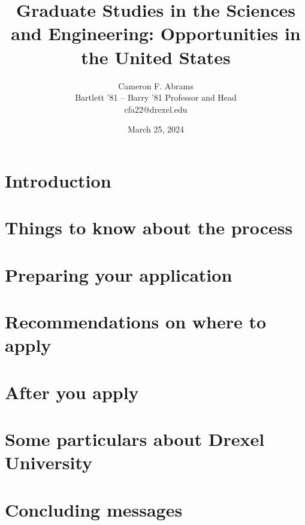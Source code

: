 \documentclass[10pt]{beamer}
\title{Graduate Studies in the Sciences and Engineering: Opportunities in the United States}
\date{March 25, 2024}
\author{Cameron F. Abrams\\Bartlett '81 -- Barry '81 Professor and Head\\cfa22@drexel.edu}
\institute{Drexel University, Department of Chemical and Biological Engineering}
\begin{document}
\maketitle




\section{Introduction}



% 


\section{Things to know about the process}






% 

\section{Preparing your application}







\section{Recommendations on where to apply}





\section{After you apply}
% 
% 
% 

\section{Some particulars about Drexel University}
% 
% 

\section{Concluding messages}
% 
% 

% 
% 
\end{document}
